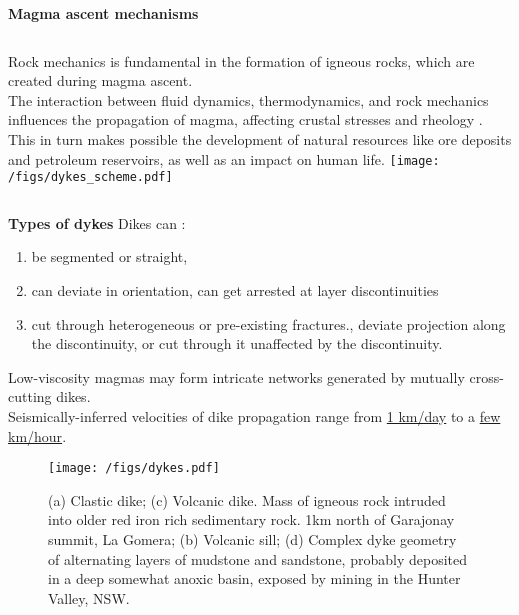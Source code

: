 \documentclass[9pt]{beamer}
\newcommand\Fontsm{\fontsize{4}{5}\selectfont}
\newcommand\Fonttab{\fontsize{12}{7.2}\selectfont}
\begin{document}
\begin{frame}[allowframebreaks]{\textbf{Magma ascent mechanisms}}
\Fonttab
\begin{columns}[onlytextwidth,T]
      \column{\dimexpr\linewidth-40mm-5mm}
Rock mechanics is fundamental in the formation of igneous rocks, which are created during magma ascent. \\
The interaction between fluid dynamics, thermodynamics, and rock mechanics influences the propagation of magma, affecting crustal stresses and rheology \colorbox{yellow}{\cite{maccaferri2011}}. \\
This in turn makes possible the development of natural resources like ore deposits and petroleum reservoirs, as well as an impact on human life.
      \column{80mm}
    \texttt{[image: /figs/dykes\_scheme.pdf]}
    \end{columns}
\end{frame}

\begin{frame}[allowframebreaks]{\textbf{Types of dykes}}
Dikes can \colorbox{yellow}{\cite{rivalta2015}}:
\begin{enumerate}
\item be segmented or straight, 
\item can deviate in orientation, can get arrested at layer discontinuities 
\item cut through heterogeneous or pre-existing fractures., deviate projection along the discontinuity, or cut through it unaffected by the discontinuity.\\
\end{enumerate}
Low-viscosity magmas may form intricate networks generated by mutually cross-cutting dikes.\\
Seismically-inferred velocities of dike propagation range from \underline{1 km/day} to a \underline{few km/hour}. 
    \Fontsm
    \begin{figure}
        \centering
    \texttt{[image: /figs/dykes.pdf]}
    \caption{(a) Clastic dike; (c) Volcanic dike. Mass of igneous rock intruded into older red iron rich sedimentary rock. 1km north of Garajonay summit, La Gomera; (b) Volcanic sill; (d) Complex dyke geometry of alternating layers of mudstone and sandstone, probably deposited in a deep somewhat anoxic basin, exposed by mining in the Hunter Valley, NSW.}
    \end{figure}
\end{frame}
\end{document}
